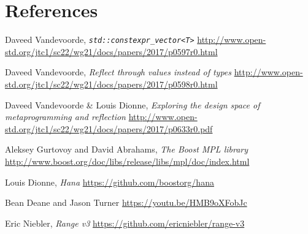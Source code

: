 \documentclass{wg21}
\newcommand{\cc}[1]{\texttt{#1}}
\begin{document}
\section{References}
\renewcommand{\section}[2]{}%
\begin{thebibliography}{9}

    Daveed Vandevoorde,
    \emph{\cc{std::constexpr_vector<T>}}\newline
    \url{http://www.open-std.org/jtc1/sc22/wg21/docs/papers/2017/p0597r0.html}

    Daveed Vandevoorde,
    \emph{Reflect through values instead of types}\newline
    \url{http://www.open-std.org/jtc1/sc22/wg21/docs/papers/2017/p0598r0.html}

    Daveed Vandevoorde \& Louis Dionne,
    \emph{Exploring the design space of metaprogramming and reflection}\newline
    \url{http://www.open-std.org/jtc1/sc22/wg21/docs/papers/2017/p0633r0.pdf}

    Aleksey Gurtovoy and David Abrahams,
    \emph{The Boost MPL library}\newline
    \url{http://www.boost.org/doc/libs/release/libs/mpl/doc/index.html}

    Louis Dionne,
    \emph{Hana}\newline
    \url{https://github.com/boostorg/hana}

    Bean Deane and Jason Turner\newline
    \url{https://youtu.be/HMB9oXFobJc}

    Eric Niebler,
    \emph{Range v3}\newline
    \url{https://github.com/ericniebler/range-v3}

\end{thebibliography}
\end{document}
